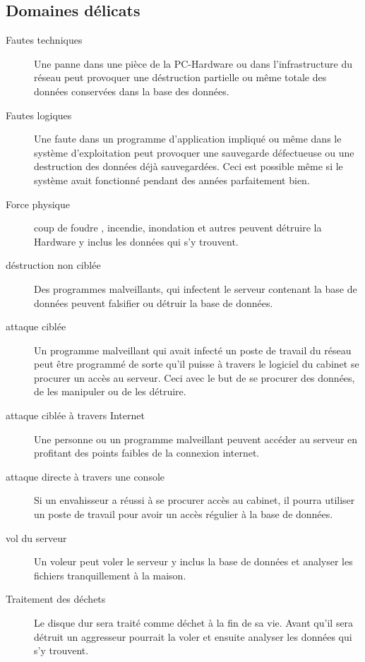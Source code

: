 \documentclass[a4paper]{scrartcl}
\begin{document}
\subsection{Domaines délicats}
\begin{description}
\item [Fautes techniques] Une panne dans une pièce de la PC-Hardware ou dans l'infrastructure du réseau peut provoquer une déstruction partielle ou même totale des données conservées dans la base des données.
\item [Fautes logiques] Une faute dans un programme d'application impliqué ou même dans le système d'exploitation peut provoquer une sauvegarde défectueuse ou une destruction des données déjà sauvegardées. Ceci est possible même si le système avait fonctionné pendant des années parfaitement bien.
\item [Force physique] coup de foudre , incendie, inondation et autres peuvent détruire la Hardware y inclus les données qui s'y trouvent.
\item [déstruction non ciblée] Des programmes malveillants, qui infectent le serveur contenant la base de données peuvent falsifier ou détruir la base de données.
\item [attaque ciblée] Un programme malveillant qui avait infecté un poste de travail du réseau peut être programmé de sorte qu'il puisse à travers le logiciel du cabinet se procurer un accès au serveur. Ceci avec le but de se procurer des données, de les manipuler ou de les détruire.
\item [attaque ciblée à travers Internet] Une personne ou un programme malveillant peuvent accéder au serveur en profitant des points faibles de la connexion internet.
\item [attaque directe à travers une console] Si un envahisseur a réussi à se procurer accès au cabinet, il pourra utiliser un poste de travail pour avoir un accès régulier à la base de données.
\item [vol du serveur] Un voleur peut voler le serveur y inclus la base de données et analyser les fichiers tranquillement à la maison.
\item [Traitement des déchets] Le disque dur sera traité comme déchet à la fin de sa vie. Avant qu'il sera détruit un aggresseur pourrait la voler et ensuite analyser les données qui s'y trouvent.
\end{description}
\end{document}
